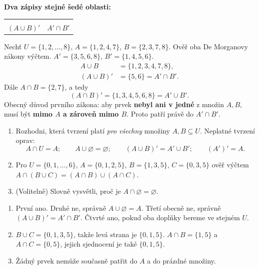 \documentclass[11pt,a4paper]{article}
\newcommand{\vennDve}[1]{%
\begin{tikzpicture}[scale=.68,baseline=(current bounding box.center)]
  \path[use as bounding box] (-2.72,-1.83) rectangle (2.72,1.79);
  #1
  \draw[thick] (-2.57,-1.63) rectangle (2.57,1.65);
  \draw[thick] (-.78,0) circle (1.25);
  \draw[thick] (.78,0) circle (1.25);
  \node at (-2.32,.15) {$A$}; \node at (2.32,.15) {$B$};
  \node[anchor=north east] at (2.49,1.56) {$U$};
\end{tikzpicture}}
\newcommand{\sedaMimoSjednoceni}{%
\fill[black!23] (-2.57,-1.63) rectangle (2.57,1.65);
\fill[white] (-.78,0) circle (1.25);
\fill[white] (.78,0) circle (1.25);}
\begin{document}
\textbf{Dva zápisy stejné šedé oblasti:}
\begin{center}
\begin{tabularx}{\linewidth}{@{}XX@{}}
\centering\vennDve{\sedaMimoSjednoceni} &
\centering\vennDve{\sedaMimoSjednoceni}\tabularnewline[-.3em]
\centering\small $(A\cup B)'$ & \centering\small $A'\cap B'$\tabularnewline
\end{tabularx}
\end{center}

\begin{prikladReseniBox}[title={Příklad 3}]
Nechť $U=\{1,2,\ldots,8\}$, $A=\{1,2,4,7\}$,
$B=\{2,3,7,8\}$. Ověř oba De Morganovy zákony výčtem.
\tcblower
$A'=\{3,5,6,8\}$, $B'=\{1,4,5,6\}$.
\begin{align*}
A\cup B&=\{1,2,3,4,7,8\},\\
(A\cup B)'&=\{5,6\}=A'\cap B'.
\end{align*}
Dále $A\cap B=\{2,7\}$, a tedy
\[
(A\cap B)'=\{1,3,4,5,6,8\}=A'\cup B'.
\]
Obecný důvod prvního zákona: aby prvek \textbf{nebyl ani v jedné}
z množin $A,B$, musí být \textbf{mimo $A$ a zároveň mimo $B$}.
Proto patří právě do $A'\cap B'$.
\end{prikladReseniBox}


\begin{zadaniReseniBox}[title={Samostatná práce 1}]
\begin{enumerate}[label=\alph*)]
\item Rozhodni, která tvrzení platí \emph{pro všechny} množiny
$A,B\subseteq U$. Neplatné tvrzení oprav:
\[
A\cap U=A;\qquad A\cup\varnothing=\varnothing;\qquad
(A\cup B)'=A'\cup B';\qquad (A')'=A.
\]
\item Pro $U=\{0,1,\ldots,6\}$, $A=\{0,1,2,5\}$,
$B=\{1,3,5\}$, $C=\{0,3,5\}$ ověř výčtem
$A\cap(B\cup C)=(A\cap B)\cup(A\cap C)$.
\item (Volitelně) Slovně vysvětli, proč je $A\cap\varnothing=\varnothing$.
\end{enumerate}
\tcblower
\begin{enumerate}[label=\alph*)]
\item První ano. Druhé ne, správně $A\cup\varnothing=A$.
Třetí obecně ne, správně $(A\cup B)'=A'\cap B'$.
Čtvrté ano, pokud oba doplňky bereme ve stejném $U$.
\item $B\cup C=\{0,1,3,5\}$, takže levá strana je $\{0,1,5\}$.
$A\cap B=\{1,5\}$ a $A\cap C=\{0,5\}$,
jejich sjednocení je také $\{0,1,5\}$.
\item Žádný prvek nemůže současně patřit do $A$ a do prázdné množiny.
\end{enumerate}
\end{zadaniReseniBox}
\end{document}
